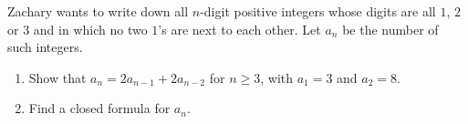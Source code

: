 Zachary wants to write down all $n$-digit positive integers whose digits are all $1$, $2$ or $3$ and in which no two $1$'s are next to each other. Let $a_n$ be the number of such integers.
\begin{enumerate}
\item[(a)] Show that $a_n=2a_{n-1}+2a_{n-2}$ for $n\ge3$, with $a_1=3$ and $a_2=8$.
\item[(b)] Find a closed formula for $a_n$.
\end{enumerate}
